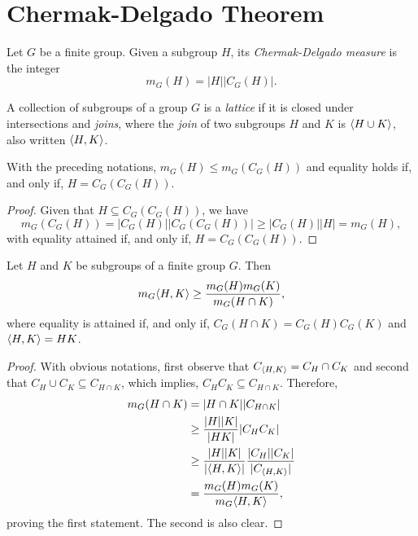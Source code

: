 \section{Chermak-Delgado Theorem}

\begin{defn}
    Let\/ $G$ be a finite group. Given a subgroup $H$, its \textsl{Chermak-Delgado measure} is the integer
    $$
        m_G(H) = |H||C_G(H)|.
    $$
\end{defn}

\begin{defn}
    A collection of subgroups of a group $G$ is a \textsl{lattice} if it is closed under intersections and \textsl{joins}, where the \textsl{join} of two subgroups $H$ and $K$ is $\langle H\cup K\rangle$, also written $\langle H,K\rangle$.
\end{defn}

\begin{lem}\label{m_G-inequality-1}
    With the preceding notations, $m_G(H)\le m_G(C_G(H))$ and equality holds if, and only if, $H=C_G(C_G(H))$.
\end{lem}

\begin{proof} Given that $H\subseteq C_G(C_G(H))$, we have
$$
    m_G(C_G(H))=|C_G(H)||C_G(C_G(H))|\ge |C_G(H)||H|=m_G(H),
$$
with equality attained if, and only if, $H=C_G(C_G(H))$.  \end{proof} 

\begin{lem}\label{m_G-inequality-2}
    Let\/ $H$ and\/ $K$ be subgroups of a finite group $G$. Then
    $$
        m_G\langle H,K\rangle \ge \frac{m_G(H)m_G(K)}{m_G(H\cap K)},
    $$
    where equality is attained if, and only if, $C_G(H\cap K) = C_G(H)C_G(K)$ and\/ $\langle H,K\rangle = HK$.
\end{lem}

\begin{proof} With obvious notations, first observe that $C_{\langle H,K\rangle}=C_H\cap C_K$ and second that $C_H\cup C_K\subseteq C_{H\cap K}$, which implies, $C_HC_K\subseteq C_{H\cap K}$. Therefore,
\begin{align*}
    m_G(H\cap K) &= |H\cap K||C_{H\cap K}|\\
        &\ge\frac{|H||K|}{|HK|}|C_HC_K|\\
        &\ge \frac{|H||K|}{|\langle H,K\rangle|}\frac{|C_H||C_K|}{|C_{\langle H,K\rangle}|}\\
        &= \frac{m_G(H)m_G(K)}{m_G\langle H,K\rangle},
\end{align*}
proving the first statement. The second is also clear.  \end{proof}

